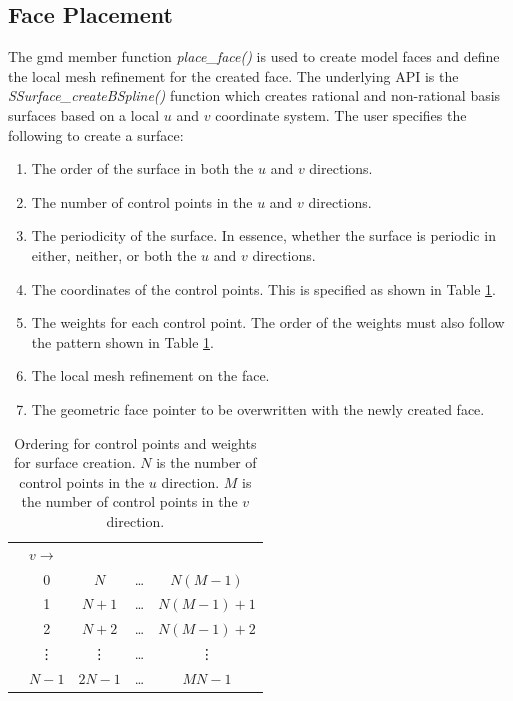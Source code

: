 \documentclass[a4paper, 12pt]{article}
\begin{document}
\subsection{Face Placement} \label{subsec:face}
The gmd member function \emph{place\_face()} is used to create model 
faces and define the local mesh refinement for the created face. The
underlying API is the \emph{SSurface\_createBSpline()} function which
creates rational and non-rational basis surfaces 
based on a local $u$ and $v$ 
coordinate system.  The user specifies the following to create a surface:
\begin{enumerate}
  \item The order of the surface in both the $u$ and $v$ directions.
  \item The number of control points in the $u$ and $v$ directions.
  \item The periodicity of the surface. In essence, whether the 
      surface is periodic in either, neither, 
      or both the $u$ and $v$ directions.
  \item The coordinates of the control points. This is specified as shown in
      Table \ref{table:cpNum}.
  \item The weights for each control point. The order of the weights must
      also follow the pattern shown in Table \ref{table:cpNum}.
  \item The local mesh refinement on the face. 
  \item The geometric face pointer to be overwritten
       with the newly created face.
\end{enumerate}

\begin{table}[H]
  \centering
  \begin{tabular}{l |c c c c |}
    \multicolumn{1}{c}{} & \multicolumn{4}{l}{ $v\longrightarrow$}\\
    \cline{2-5}
    \parbox[t]{2mm}{
        {}} 
    &0        & $N$     & \dots  & $N(M-1)$   \\
    &1        & $N+1$   & \dots  & $N(M-1)+1$ \\
    &2        & $N+2$   & \dots  & $N(M-1)+2$ \\
    &\vdots   & \vdots  & \dots  & \vdots     \\
    &$N-1$    & $2N-1$  & \dots  & $MN-1$     \\
  \end{tabular}
  \caption{Ordering for control points and 
    weights for surface creation. $N$ is 
    the number of control points in the $u$ direction. $M$ is the number of
    control points in the $v$ direction.}
  \label{table:cpNum}
\end{table}
\end{document}
